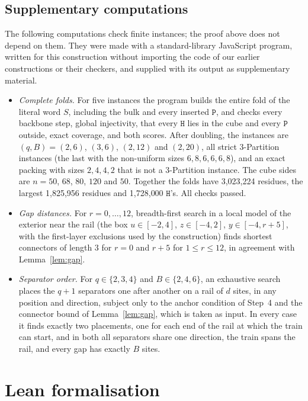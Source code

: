\documentclass[11pt,letterpaper]{article}
\theoremstyle{definition}
\theoremstyle{remark}
\newcommand{\Hh}{\mathtt{H}}
\newcommand{\Pp}{\mathtt{P}}
\begin{document}
\subsection{Supplementary computations}
The following computations check finite instances; the proof above does not depend on them. They
were made with a standard-library JavaScript program, written for this construction without
importing the code of our earlier constructions or their checkers, and supplied with its output as
supplementary material.
\begin{itemize}
  \item \emph{Complete folds.} For five instances the program builds the entire fold of the literal
    word $S$, including the bulk and every inserted $\Pp$, and checks every backbone step, global
    injectivity, that every $\Hh$ lies in the cube and every $\Pp$ outside, exact coverage, and both
    scores. After doubling, the instances are $(q,B)=(2,6)$, $(3,6)$, $(2,12)$ and $(2,20)$, all strict
    3-Partition instances (the last with the non-uniform sizes $6,8,6,6,6,8$), and an exact packing
    with sizes $2,4,4,2$ that is not a 3-Partition instance. The cube sides are $n=50$, $68$, $80$, $120$
    and $50$. Together the folds have 3{,}023{,}224 residues, the largest 1{,}825{,}956 residues and
    1{,}728{,}000 $\Hh$'s. All checks passed.
  \item \emph{Gap distances.} For $r=0,\dots,12$, breadth-first search in a local model of the
    exterior near the rail (the box $u\in[-2,4]$, $z\in[-4,2]$, $y\in[-4,r+5]$, with the first-layer
    exclusions used by the construction) finds shortest connectors of length $3$ for $r=0$ and $r+5$
    for $1\le r\le12$, in agreement with Lemma~\ref{lem:gap}.
  \item \emph{Separator order.} For $q\in\{2,3,4\}$ and $B\in\{2,4,6\}$, an exhaustive search places the
    $q+1$ separators one after another on a rail of $d$ sites, in any position and direction, subject
    only to the anchor condition of Step~4 and the connector bound of Lemma~\ref{lem:gap}, which is
    taken as input. In every case it finds exactly two placements, one for each end of the rail at
    which the train can start, and in both all separators share one direction, the train spans the
    rail, and every gap has exactly $B$ sites.
\end{itemize}

\section{Lean formalisation}\label{sec:lean}
\end{document}
